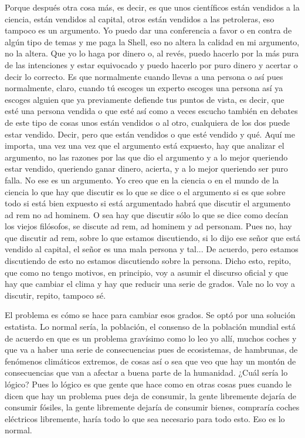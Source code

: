 Porque después otra cosa más, es decir, es que unos científicos están vendidos a la ciencia, están vendidos al capital, otros están vendidos a las petroleras, eso tampoco es un argumento. Yo puedo dar una conferencia a favor o en contra de algún tipo de temas y me paga la Shell, eso no altera la calidad en mi argumento, no la altera. Que yo lo haga por dinero o, al revés, puedo hacerlo por la más pura de las intenciones y estar equivocado y puedo hacerlo por puro dinero y acertar o decir lo correcto. Es que normalmente cuando llevas a una persona o así pues normalmente, claro, cuando tú escoges un experto escoges una persona así ya escoges alguien que ya previamente defiende tus puntos de vista, es decir, que esté una persona vendida o que esté así como a veces escucho también en debates de este tipo de cosas unos están vendidos o al otro, cualquiera de los dos puede estar vendido. Decir, pero que están vendidos o que esté vendido y qué. Aquí me importa, una vez una vez que el argumento está expuesto, hay que analizar el argumento, no las razones por las que dio el argumento y a lo mejor queriendo estar vendido, queriendo ganar dinero, acierta, y a lo mejor queriendo ser puro falla. No ese es un argumento. Yo creo que en la ciencia o en el mundo de la ciencia lo que hay que discutir es lo que se dice o el argumento si es que sobre todo si está bien expuesto si está argumentado habrá que discutir el argumento ad rem no ad hominem. O sea hay que discutir sólo lo que se dice como decían los viejos filósofos, se discute ad rem, ad hominem y ad personam. Pues no, hay que discutir ad rem, sobre lo que estamos discutiendo, si lo dijo ese señor que está vendido al capital, el señor es una mala persona y tal... De acuerdo, pero estamos discutiendo de esto no estamos discutiendo sobre la persona. Dicho esto, repito, que como no tengo motivos, en principio, voy a asumir el discurso oficial y que hay que cambiar el clima y hay que reducir una serie de grados. Vale no lo voy a discutir, repito, tampoco sé.

El problema es cómo se hace para cambiar esos grados. Se optó por una solución estatista. Lo normal sería, la población, el consenso de la población mundial está de acuerdo en que es un problema gravísimo como lo leo yo allí, muchos coches y que va a haber una serie de consecuencias pues de ecosistemas, de hambrunas, de fenómenos climáticos extremos, de cosas así o sea que veo que hay un montón de consecuencias que van a afectar a buena parte de la humanidad. ¿Cuál sería lo lógico? Pues lo lógico es que gente que hace como en otras cosas pues cuando le dicen que hay un problema pues deja de consumir, la gente libremente dejaría de consumir fósiles, la gente libremente dejaría de consumir bienes, compraría coches eléctricos libremente, haría todo lo que sea necesario para todo esto. Eso es lo normal.

